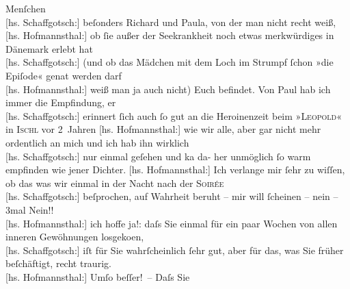 \begin{ledgroupsized}[t]{13cm}
                    Menſchen {\\}{[}hs. Schaffgotsch:{]} beſonders Richard und Paula, von der man
                    nicht recht weiß, {\\}{[}hs. Hofmannsthal:{]} ob ſie außer der Seekrankheit noch
                    etwas merkwürdiges in Dänemark erlebt hat
                        {\\}{[}hs. Schaffgotsch:{]}  (und ob das Mädchen mit dem Loch im Strumpf
                    ſchon »die Epiſode« gena{\geminationn}t werden darf {\\}{[}hs. Hofmannsthal:{]} weiß man ja auch nicht) Euch befindet.\pend
           \pstart
           Von Paul hab ich immer die Empfindung, er
                        {\\}{[}hs. Schaffgotsch:{]} erinnert ſich auch ſo gut an die Heroinenzeit
                    beim »\textsc{Leopold}« in \textsc{Ischl} vor 2 Jahren \pend
           \pstart
           {\pb}{[}hs. Hofmannsthal:{]} wie wir alle, aber gar nicht mehr ordentlich an mich
                    und ich hab ihn wirklich {\\}{[}hs. Schaffgotsch:{]} nur einmal geſehen und ka{\geminationn} da- her unmöglich ſo warm empfinden wie jener
                    Dichter.\pend
           \pstart
           {[}hs. Hofmannsthal:{]} Ich verlange mir ſehr zu wiſſen, ob das was wir
                    einmal in der Nacht nach der \textsc{Soirée}{\\}{[}hs. Schaffgotsch:{]} beſprochen, auf Wahrheit beruht – mir will ſcheinen
                    – nein – 3mal Nein!! {\\}{[}hs. Hofmannsthal:{]} ich hoffe ja!: daſs Sie einmal
                    für ein paar Wochen von allen inneren Gewöhnungen losgeko{\geminationm}en, {\\}{[}hs. Schaffgotsch:{]} iſt für Sie
                    wahrſcheinlich ſehr gut, aber \introOben{}für\introOben{} das, was Sie früher
                    beſchäftigt, recht traurig. {\\}{[}hs. Hofmannsthal:{]} Umſo beſſer! – Daſs Sie

\end{ledgroupsized}
